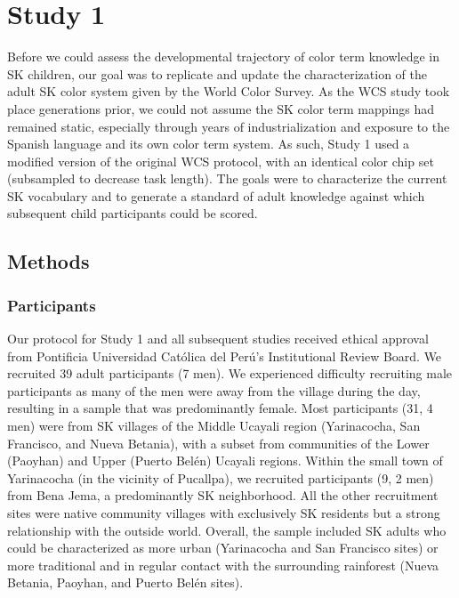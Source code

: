 \documentclass[
  english,
  ,apa7,floatsintext]{apa6}
\begin{document}
\hypertarget{study-1}{%
\section{Study 1}\label{study-1}}

Before we could assess the developmental trajectory of color term knowledge in SK children, our goal was to replicate and update the characterization of the adult SK color system given by the World Color Survey. As the WCS study took place generations prior, we could not assume the SK color term mappings had remained static, especially through years of industrialization and exposure to the Spanish language and its own color term system. As such, Study 1 used a modified version of the original WCS protocol, with an identical color chip set (subsampled to decrease task length). The goals were to characterize the current SK vocabulary and to generate a standard of adult knowledge against which subsequent child participants could be scored.

\hypertarget{methods}{%
\subsection{Methods}\label{methods}}

\hypertarget{participants}{%
\subsubsection{Participants}\label{participants}}

Our protocol for Study 1 and all subsequent studies received ethical approval from Pontificia Universidad Católica del Perú's Institutional Review Board. We recruited 39 adult participants (7 men). We experienced difficulty recruiting male participants as many of the men were away from the village during the day, resulting in a sample that was predominantly female. Most participants (31, 4 men) were from SK villages of the Middle Ucayali region (Yarinacocha, San Francisco, and Nueva Betania), with a subset from communities of the Lower (Paoyhan) and Upper (Puerto Belén) Ucayali regions. Within the small town of Yarinacocha (in the vicinity of Pucallpa), we recruited participants (9, 2 men) from Bena Jema, a predominantly SK neighborhood. All the other recruitment sites were native community villages with exclusively SK residents but a strong relationship with the outside world. Overall, the sample included SK adults who could be characterized as more urban (Yarinacocha and San Francisco sites) or more traditional and in regular contact with the surrounding rainforest (Nueva Betania, Paoyhan, and Puerto Belén sites).
\end{document}
